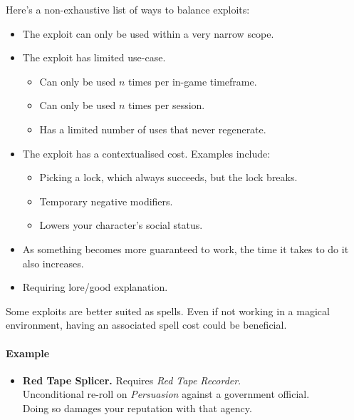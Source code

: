 Here's a non-exhaustive list of ways to balance exploits:
\begin{itemize}
    \item The exploit can only be used within a very narrow scope.
    \item The exploit has limited use-case.
    \begin{itemize}
        \item Can only be used $n$ times per in-game timeframe.
        \item Can only be used $n$ times per session.
        \item Has a limited number of uses that never regenerate.
    \end{itemize}
    \item The exploit has a contextualised cost. Examples include:
    \begin{itemize}
        \item Picking a lock, which always succeeds, but the lock breaks.
        \item Temporary negative modifiers.
        \item Lowers your character's social status.
    \end{itemize}
    \item As something becomes more guaranteed to work, the time it takes to do it also increases.
    \item Requiring lore/good explanation.
\end{itemize}

Some exploits are better suited as spells. Even if not working in a magical environment, having an associated spell cost could be beneficial.

\paragraph{Example}
\begin{itemize}
    \item \textbf{Red Tape Splicer.} Requires \textit{Red Tape Recorder}.\\
    Unconditional re-roll on \textit{Persuasion} against a government official.\\
    Doing so damages your reputation with that agency.
\end{itemize}